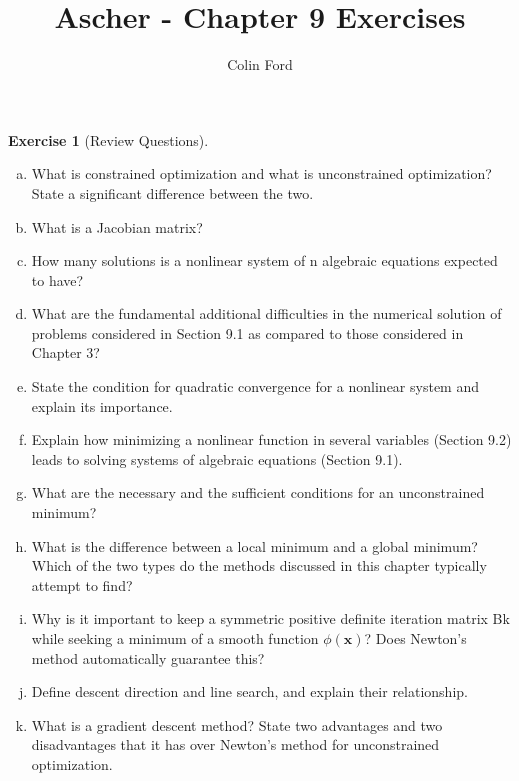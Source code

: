 \documentclass[12pt,a4]{article}
\author{Colin Ford}
\title{Ascher - Chapter 9 Exercises}
\date{}
\theoremstyle{definition}
\newtheorem{exercise}{Exercise}
\begin{document}
\maketitle

\begin{exercise}[Review Questions]
	\begin{enumerate}[(a)]
		\item What is constrained optimization and what is unconstrained optimization? State a significant difference between the two.
		
		\item What is a Jacobian matrix?
		
		\item How many solutions is a nonlinear system of n algebraic equations expected to have?
		
		\item What are the fundamental additional difficulties in the numerical solution of problems considered in Section 9.1 as compared to those considered in Chapter 3?
		
		\item State the condition for quadratic convergence for a nonlinear system and explain its importance.
		
		\item Explain how minimizing a nonlinear function in several variables (Section 9.2) leads to solving systems of algebraic equations (Section 9.1).
		
		\item What are the necessary and the sufficient conditions for an unconstrained minimum?
		
		\item What is the difference between a local minimum and a global minimum? Which of the two types do the methods discussed in this chapter typically attempt to find?

		\item Why is it important to keep a symmetric positive definite iteration matrix Bk while seeking a minimum of a smooth function $\phi(\mathbf{x})$? Does Newton’s method automatically guarantee this?
		
		\item Define descent direction and line search, and explain their relationship.
		
		\item What is a gradient descent method? State two advantages and two disadvantages that it has over Newton’s method for unconstrained optimization.
		

\end{enumerate}
\end{exercise}
\end{document}
